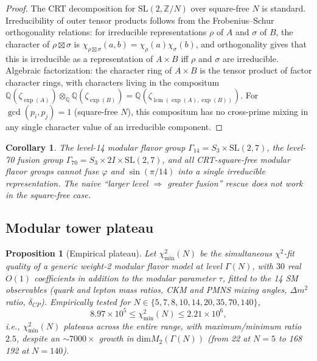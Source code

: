 \documentclass[11pt,a4paper]{amsart}
\DeclareMathOperator{\lcm}{lcm}
\newtheorem{proposition}[theorem]{Proposition}
\newtheorem{corollary}[theorem]{Corollary}
\theoremstyle{definition}
\theoremstyle{remark}
\newcommand{\SL}{\mathrm{SL}}
\newcommand{\dimm}{\mathrm{dim}}
\newcommand{\bbZ}{\mathbb{Z}}
\newcommand{\bbQ}{\mathbb{Q}}
\begin{document}
\begin{proof}
The CRT decomposition for $\SL(2,\bbZ/N)$ over square-free $N$ is standard.
Irreducibility of outer tensor products follows from the Frobenius--Schur
orthogonality relations: for irreducible representations $\rho$ of $A$ and
$\sigma$ of $B$, the character of $\rho \boxtimes \sigma$ is
$\chi_{\rho \boxtimes \sigma}(a, b) = \chi_\rho(a) \chi_\sigma(b)$, and
orthogonality gives that this is irreducible as a representation of
$A \times B$ iff $\rho$ and $\sigma$ are irreducible. Algebraic factorization:
the character ring of $A \times B$ is the tensor product of factor character
rings, with characters living in the compositum
$\bbQ(\zeta_{\exp(A)}) \otimes_\bbQ \bbQ(\zeta_{\exp(B)}) = \bbQ(\zeta_{\lcm(\exp(A), \exp(B))})$.
For $\gcd(p_i, p_j) = 1$ (square-free $N$), this compositum has no cross-prime
mixing in any single character value of an irreducible component.
\end{proof}

\begin{corollary}
The level-14 modular flavor group $\Gamma_{14} = S_3 \times \SL(2,7)$, the
level-70 fusion group $\Gamma_{70} = S_3 \times 2I \times \SL(2,7)$, and all
CRT-square-free modular flavor groups cannot fuse $\varphi$ and $\sin(\pi/14)$
into a single irreducible representation. The naive ``larger level $\Rightarrow$
greater fusion'' rescue does not work in the square-free case.
\end{corollary}

\subsection{Modular tower plateau}

\begin{proposition}[Empirical plateau]\label{thm:plateau}
Let $\chi^2_{\min}(N)$ be the simultaneous $\chi^2$-fit quality of a generic
weight-2 modular flavor model at level $\Gamma(N)$, with $30$ real $O(1)$
coefficients in addition to the modular parameter $\tau$, fitted to the 14
SM observables (quark and lepton mass ratios, CKM and PMNS mixing angles,
$\Delta m^2$ ratio, $\delta_{CP}$). Empirically tested for
$N \in \{5, 7, 8, 10, 14, 20, 35, 70, 140\}$,
\[ 8.97 \times 10^5 \leq \chi^2_{\min}(N) \leq 2.21 \times 10^6, \]
i.e., $\chi^2_{\min}(N)$ plateaus across the entire range, with maximum/minimum
ratio $2.5$, despite an $\sim$$7000\times$ growth in $\dimm M_2(\Gamma(N))$
(from 22 at $N = 5$ to 168\,192 at $N = 140$).
\end{proposition}
\end{document}
